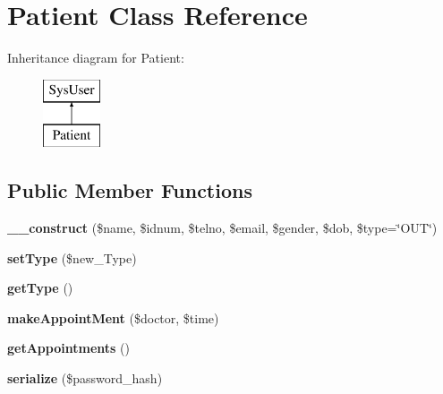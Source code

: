 \hypertarget{classPatient}{\section{Patient Class Reference}
\label{classPatient}
}
Inheritance diagram for Patient\-:\begin{figure}[H]
\begin{center}
\leavevmode
\includegraphics[height=2.000000cm]{classPatient}
\end{center}
\end{figure}
\subsection*{Public Member Functions}
\begin{DoxyCompactItemize}
\item 
\hypertarget{classPatient_a4e75dac1c9d06338482d777d0184240c}{{\bfseries \-\_\-\-\_\-construct} (\$name, \$idnum, \$telno, \$email, \$gender, \$dob, \$type=\char`\"{}O\-U\-T\char`\"{})}\label{classPatient_a4e75dac1c9d06338482d777d0184240c}

\item 
\hypertarget{classPatient_ab77aada6d6d1eecb12c2bb3c45513c02}{{\bfseries set\-Type} (\$new\-\_\-\-Type)}\label{classPatient_ab77aada6d6d1eecb12c2bb3c45513c02}

\item 
\hypertarget{classPatient_a3ec54d47b8e74e4398ab4f416bc5c602}{{\bfseries get\-Type} ()}\label{classPatient_a3ec54d47b8e74e4398ab4f416bc5c602}

\item 
\hypertarget{classPatient_a161fe1524242a4f21ff1e8cabfdb5103}{{\bfseries make\-Appoint\-Ment} (\$doctor, \$time)}\label{classPatient_a161fe1524242a4f21ff1e8cabfdb5103}

\item 
\hypertarget{classPatient_a1b338c7e712cb35dc7ef6262f54321ce}{{\bfseries get\-Appointments} ()}\label{classPatient_a1b338c7e712cb35dc7ef6262f54321ce}

\item 
\hypertarget{classPatient_a9b0c89df3a6ca692132b90062fc05088}{{\bfseries serialize} (\$password\-\_\-hash)}\label{classPatient_a9b0c89df3a6ca692132b90062fc05088}

\end{DoxyCompactItemize}
